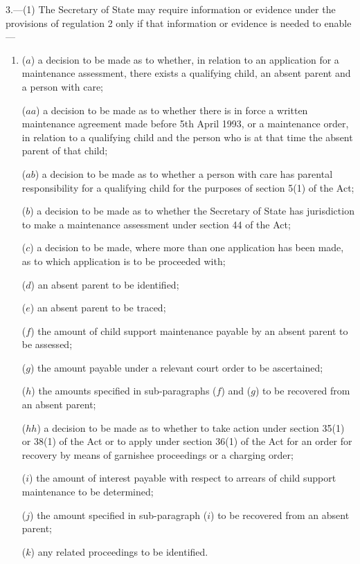 \documentclass[a4paper,12pt]{article}
\begin{document}
3.—(1) The Secretary of State 
may require information or evidence under the provisions of regulation 2 only if that information or evidence is needed to enable—
\begin{enumerate}\item[]
($a$) a decision to be made as to whether, in relation to an application for a maintenance assessment, there exists a qualifying child, an absent parent and a person with care;

($aa$) a decision to be made as to whether there is in force a written maintenance agreement made before 5th April 1993, or a maintenance order, in relation to a qualifying child and the person who is at that time the absent parent of that child;

($ab$) a decision to be made as to whether a person with care has parental responsibility for a qualifying child for the purposes of section 5(1) of the Act;

($b$) a decision to be made as to whether 
the Secretary of State  %
has jurisdiction to make a maintenance assessment under section 44 of the Act;

($c$) a decision to be made, where more than one application has been made, as to which application is to be proceeded with;

($d$) an absent parent to be identified;

($e$) an absent parent to be traced;

($f$) the amount of child support maintenance payable by an absent parent to be assessed;

($g$) the amount payable under a relevant court order to be ascertained;

($h$) the amounts specified in sub-paragraphs ($f$) and ($g$) to be recovered from an absent parent;

($hh$) a decision to be made as to whether to take action under section 35(1) or 38(1) of the Act or to apply under section 36(1) of the Act for an order for recovery by means of garnishee proceedings or a charging order;

($i$) the amount of interest payable with respect to arrears of child support maintenance to be determined;

($j$) the amount specified in sub-paragraph ($i$) to be recovered from an absent parent;

($k$) any related proceedings to be identified.
\end{enumerate}
\end{document}
